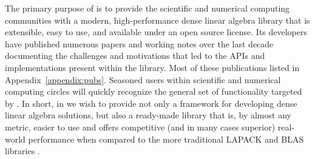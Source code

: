 The primary purpose of \libflame is to provide the scientific and
numerical computing communities with a modern, high-performance dense linear
algebra library that is extensible, easy to use, and available under an open
source license.
Its developers have published numerous papers and working notes
over the last decade documenting the challenges and motivations that led to the
APIs and implementations present within the \libflame library.
Most of these publications listed in Appendix~\ref{appendix:pubs}.
Seasoned users within scientific and numerical computing circles will quickly
recognize the general set of functionality targeted by \libflamens.
In short, in \libflame we wish to provide not only a framework for developing
dense linear algebra solutions, but also a ready-made library that is, by
almost any metric, easier to use and offers competitive (and in many cases
superior) real-world performance when compared to the more traditional LAPACK
and BLAS libraries \cite{LAPACK3,BLAS1,BLAS2,BLAS2,BLAS3}.



